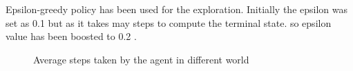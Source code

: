 \documentclass[preprint,12pt]{elsarticle}
\begin{document}
Epsilon-greedy policy has been used for the exploration. Initially the epsilon was set as 0.1 but as it takes may steps to compute the terminal state. so epsilon value has been boosted to 0.2 . 

\begin{figure}[H]
	\centering  
	\caption{Average steps taken by the agent in different world}
	\label{fig:stepsQ}
\end{figure}
\end{document}
